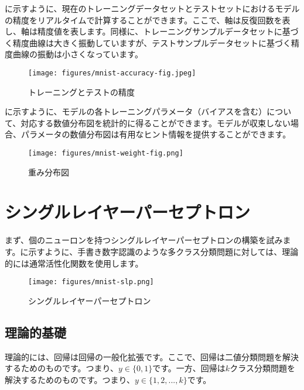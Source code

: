 \begin{content}
\begin{content}
に示すように、現在のトレーニングデータセットとテストセットにおけるモデルの精度をリアルタイムで計算することができます。ここで、軸は反復回数を表し、軸は精度値を表します。同様に、トレーニングサンプルデータセットに基づく精度曲線は大きく振動していますが、テストサンプルデータセットに基づく精度曲線の振動は小さくなっています。

\begin{figure}[H]
\centering
\texttt{[image: figures/mnist-accuracy-fig.jpeg]}
\caption{トレーニングとテストの精度}
 \label{fig:mnist-accuracy-fig}
\end{figure}

に示すように、モデルの各トレーニングパラメータ（バイアスを含む）について、対応する数値分布図を統計的に得ることができます。モデルが収束しない場合、パラメータの数値分布図は有用なヒント情報を提供することができます。

\begin{figure}[H]
\centering
\texttt{[image: figures/mnist-weight-fig.png]}
\caption{重み分布図}
 \label{fig:mnist-weight-fig}
\end{figure}

\end{content}

\section{シングルレイヤーパーセプトロン}

\begin{content}

まず、個のニューロンを持つシングルレイヤーパーセプトロンの構築を試みます。に示すように、手書き数字認識のような多クラス分類問題に対しては、理論的には通常活性化関数を使用します。

\begin{figure}[H]
\centering
\texttt{[image: figures/mnist-slp.png]}
\caption{シングルレイヤーパーセプトロン}
 \label{fig:mnist-slp}
\end{figure}

\subsection{理論的基礎}

理論的には、回帰は回帰の一般化拡張です。ここで、回帰は二値分類問題を解決するためのものです。つまり、$y \in \{ 0,1\}$です。一方、回帰は$ k $クラス分類問題を解決するためのものです。つまり、$y \in \{ 1,2,...,k\}$です。


\end{content}
\end{content}
